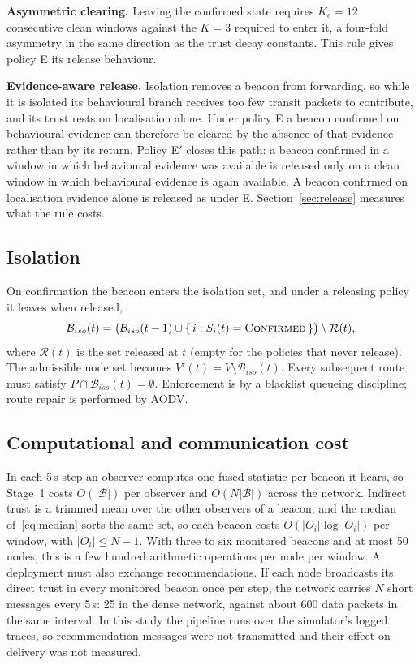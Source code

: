 \textbf{Asymmetric clearing.} Leaving the confirmed state requires $K_c = 12$
consecutive clean windows against the $K = 3$ required to enter it, a four-fold
asymmetry in the same direction as the trust decay constants. This rule gives
policy E its release behaviour.

\textbf{Evidence-aware release.} Isolation removes a beacon from forwarding, so
while it is isolated its behavioural branch receives too few transit packets
to contribute, and its trust rests on localisation alone. Under policy E a
beacon confirmed on behavioural evidence can therefore be cleared by the
absence of that evidence rather than by its return. Policy E$'$ closes this
path: a beacon confirmed in a window in which behavioural evidence was
available is released only on a clean window in which behavioural evidence is
again available. A beacon confirmed on localisation evidence alone is released
as under E. Section~\ref{sec:release} measures what the rule costs.

\subsection{Isolation}

On confirmation the beacon enters the isolation set, and under a releasing
policy it leaves when released,
\begin{equation}
\label{eq:iso}
\mathcal{B}_{iso}(t) = \bigl(\mathcal{B}_{iso}(t-1) \cup \{\, i : S_i(t) = \textsc{Confirmed} \,\}\bigr)
\setminus \mathcal{R}(t),
\end{equation}
where $\mathcal{R}(t)$ is the set released at $t$ (empty for the policies
that never release). The admissible node set becomes $V'(t) = V \setminus \mathcal{B}_{iso}(t)$.
Every subsequent route must satisfy $P \cap \mathcal{B}_{iso}(t) = \emptyset$.
Enforcement is by a blacklist queueing discipline; route repair is performed by
AODV.

\subsection{Computational and communication cost}
\label{sec:cost}

In each 5\,s step an observer computes one fused statistic per beacon it
hears, so Stage~1 costs $O(|\mathcal{B}|)$ per observer and
$O(N|\mathcal{B}|)$ across the network. Indirect trust is a trimmed mean over
the other observers of a beacon, and the median of~\eqref{eq:median} sorts the
same set, so each beacon costs $O(|O_i| \log |O_i|)$ per window, with
$|O_i| \le N-1$. With three to six monitored beacons and at most 50 nodes,
this is a few hundred arithmetic operations per node per window. A deployment
must also exchange recommendations. If each node broadcasts its direct trust
in every monitored beacon once per step, the network carries $N$ short
messages every 5\,s: 25 in the dense network, against about 600 data packets
in the same interval. In this study the pipeline runs over the simulator's
logged traces, so recommendation messages were not transmitted and their
effect on delivery was not measured.

